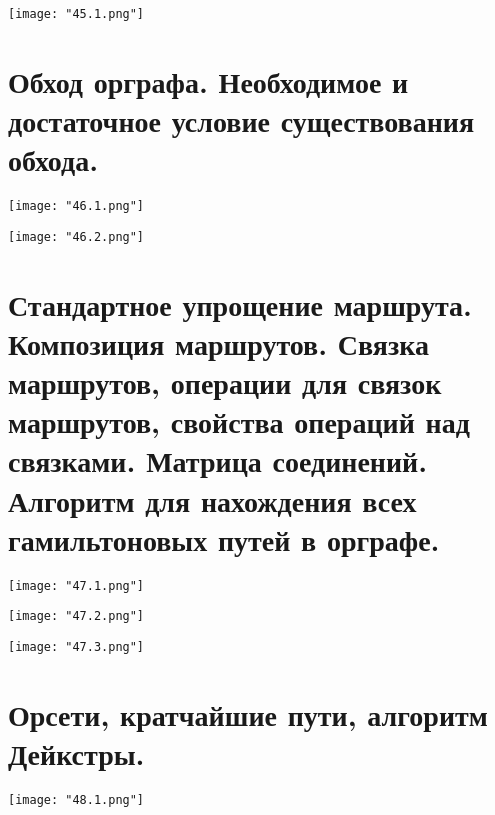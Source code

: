 \begin{center}
    \texttt{[image: "45.1.png"]}
\end{center}

\section{Обход орграфа. Необходимое и достаточное условие существования обхода.}

\begin{center}
    \texttt{[image: "46.1.png"]}
    \bigskip

    \texttt{[image: "46.2.png"]}
\end{center}

\section{Стандартное упрощение маршрута. Композиция маршрутов. Связка маршрутов, 
операции для связок маршрутов, свойства операций над связками. Матрица 
соединений. Алгоритм для нахождения всех гамильтоновых путей в орграфе.}

\begin{center}
    \texttt{[image: "47.1.png"]}
    \bigskip

    \texttt{[image: "47.2.png"]}
    \bigskip

    \texttt{[image: "47.3.png"]}
\end{center}

\section{Орсети, кратчайшие пути, алгоритм Дейкстры.}
    
\begin{center}
    \texttt{[image: "48.1.png"]}
\end{center}


